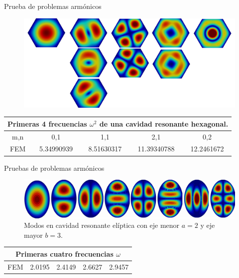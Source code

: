 \documentclass[xcolor=table,serif]{beamer}
\begin{document}
	\begin{frame}{Prueba de problemas armónicos}
	\begin{figure}
\centering
\includegraphics[scale=0.07]{hexagonal_waveguide.pdf}
\end{figure}
\small
\begin{center}
\begin{tabular}{|c|c|c|c|c|}
\hline
\multicolumn{5}{|c|}{Primeras 4 frecuencias $\omega^2$ de una cavidad resonante hexagonal.} \\
\hline 
m,n & 0,1 & 1,1 & 2,1 & 0,2 \\ 
\hline 
FEM     & 5.34990939 & 8.51630317 & 11.39340788 & 12.2461672 \\ 
\hline 
\end{tabular} 
\label{tab:hex_wav_comparison}
\end{center}
	\end{frame}
	\begin{frame}{Pruebas de problemas armónicos}
		\begin{figure}
		\centering
		\includegraphics[scale=0.07]{elliptical_waveguide.eps}
		\caption{Modos en cavidad resonante elíptica con eje menor  $a=2$ y eje mayor $b=3$.}
		\end{figure}	
		\begin{center}
		\begin{tabular}{|c|c|c|c|c|}
		\hline
		\multicolumn{5}{|c|}{Primeras cuatro frecuencias $\omega$} 		\\
		\hline 
		FEM & 2.0195 & 2.4149 & 2.6627 & 2.9457 \\ 
		\hline 
		\end{tabular} 
		\end{center}	
	\end{frame}
\end{document}
